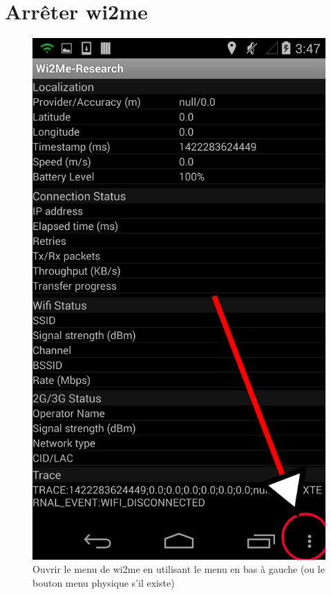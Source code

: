 \documentclass[11pt]{article}
\newcommand\mtext[2]{#1}
\newcommand\mtext[2]{#2}
\begin{document}
\section{\mtext{Arrêter wi2me}{Stopping Wi2Me}}\label{stopping}

\begin{figure}
  \centering
  \caption{\mtext{ Ouvrir le menu de wi2me en utilisant le menu en bas à gauche (ou le bouton menu physique s'il existe)}{Open the application menu by using the menu button in the bottom left (or your phone's physical menu button if it exists).}}
  \includegraphics[height=0.4\textheight]{MenuStop.png}
\end{figure}
\end{document}
